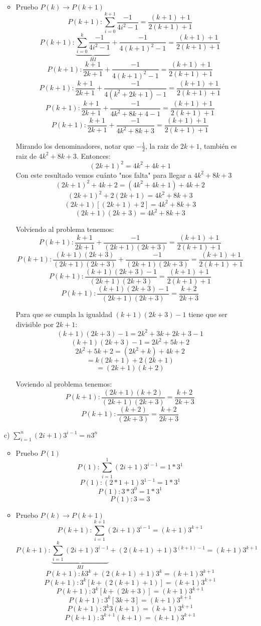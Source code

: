 \documentclass[10pt,a4paper]{article}
\begin{document}
\begin{enumerate}
\begin{itemize}
	\item Pruebo $P(k)\rightarrow P(k+1)$
	$$P(k+1):\sum^{k+1}_{i=0}\frac{-1}{4i^{2}-1}=\frac{(k+1)+1}{2(k+1)+1}$$
	$$P(k+1):\underbrace{\sum^{k}_{i=0}\frac{-1}{4i^{2}-1}}_{HI} + \frac{-1}{4(k+1)^{2}-1}  =\frac{(k+1)+1}{2(k+1)+1}$$
	$$P(k+1):  \frac{k+1}{2k+1}   + \frac{-1}{4(k+1)^{2}-1}  =\frac{(k+1)+1}{2(k+1)+1}$$
	$$P(k+1):  \frac{k+1}{2k+1}   + \frac{-1}{4(k^{2}+2k+1)-1}  =\frac{(k+1)+1}{2(k+1)+1}$$
	$$P(k+1):  \frac{k+1}{2k+1}   + \frac{-1}{4k^{2}+8k+4-1}  =\frac{(k+1)+1}{2(k+1)+1}$$
	$$P(k+1):  \frac{k+1}{2k+1}   + \frac{-1}{4k^{2}+8k+3}  =\frac{(k+1)+1}{2(k+1)+1}$$
	
	Mirando los denominadores, notar que $-\frac{1}{2}$, la raiz de $2k+1$, también es raiz de $4k^{2}+8k+3$. Entonces:
	$$(2k+1)^{2}=4k^{2}+4k+1$$ 
	Con este resultado vemos cuánto "nos falta" para llegar a $4k^{2}+8k+3$
	$$(2k+1)^{2}+4k+2=(4k^{2}+4k+1)+4k+2$$ 
	$$(2k+1)^{2}+ 2(2k+1)=4k^{2}+8k+3$$ 
	$$(2k+1)[ (2k+1)+ 2]=4k^{2}+8k+3$$ 
	$$(2k+1)(2k+3)=4k^{2}+8k+3$$ 
	
	Volviendo al problema tenemos:
	$$P(k+1):  \frac{k+1}{2k+1}   + \frac{-1}{(2k+1)(2k+3)}  =\frac{(k+1)+1}{2(k+1)+1}$$
	$$P(k+1):  \frac{(k+1)(2k+3)}{(2k+1)(2k+3)}   + \frac{-1}{(2k+1)(2k+3)}  =\frac{(k+1)+1}{2(k+1)+1}$$
	$$P(k+1):  \frac{(k+1)(2k+3)-1}{(2k+1)(2k+3)}  =\frac{(k+1)+1}{2(k+1)+1}$$
	$$P(k+1):  \frac{(k+1)(2k+3)-1}{(2k+1)(2k+3)}  =\frac{k+2}{2k+3}$$
	
	Para que se cumpla la igualdad $(k+1)(2k+3)-1$ tiene que ser divisible por $2k+1$:
	 $$(k+1)(2k+3)-1= 2k^{2}+3k+2k+3-1$$
	 $$(k+1)(2k+3)-1= 2k^{2}+5k+2$$
	 $$2k^{2}+5k+2= (2k^{2}+k)+4k+2$$
	 $$= k(2k+1)+2(2k+1)$$
	 $$= (2k+1)(k+2)$$

	 Voviendo al problema tenemos:
	$$P(k+1):  \frac{(2k+1)(k+2)}{(2k+1)(2k+3)}  =\frac{k+2}{2k+3}$$
	$$P(k+1):  \frac{(k+2)}{(2k+3)}  =\frac{k+2}{2k+3}$$

	\end{itemize}
	
\item[c)] $\sum^{n}_{i=1}(2i+1)3^{i-1}=n3^{n}$
	\begin{itemize}
	\item Pruebo $P(1)$
	$$P(1):\sum^{1}_{i=1}(2i+1)3^{i-1}=1*3^{1}$$
	$$P(1):(2*1+1)3^{1-1}=1*3^{1}$$
	$$P(1):3*3^{0}=1*3^{1}$$
	$$P(1):3=3$$
	
	\item Pruebo $P(k)\rightarrow P(k+1)$
	$$P(k+1):\sum^{k+1}_{i=1}(2i+1)3^{i-1}=(k+1)3^{k+1}$$
	$$P(k+1):\underbrace{\sum^{k}_{i=1}(2i+1)3^{i-1}}_{HI}  +  (2(k+1)+1)3^{(k+1)-1}   =(k+1)3^{k+1}$$
	$$P(k+1):   k3^{k}   +  (2(k+1)+1)3^{k}   =(k+1)3^{k+1}$$
	$$P(k+1):   3^{k}[k+ (2(k+1)+1) ]   =(k+1)3^{k+1}$$
	$$P(k+1):   3^{k}[k+ (2k+3) ]   =(k+1)3^{k+1}$$
	$$P(k+1):   3^{k}[3k+3 ]   =(k+1)3^{k+1}$$
	$$P(k+1):   3^{k}3(k+1)   =(k+1)3^{k+1}$$
	$$P(k+1):   3^{k+1}(k+1)   =(k+1)3^{k+1}$$
	\end{itemize}
	

\end{enumerate}
\end{document}
